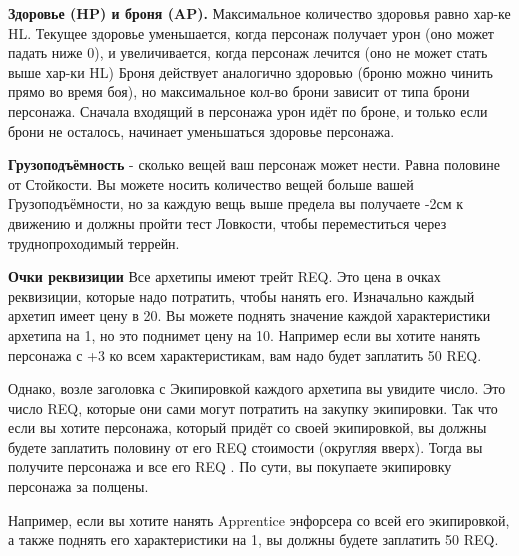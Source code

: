 \begin{multicols}{2}
\textbf{Здоровье (HP) и броня (AP).}
Максимальное количество здоровья равно хар-ке HL. Текущее здоровье уменьшается, когда персонаж получает 
урон (оно может падать ниже 0), и увеличивается, когда персонаж лечится (оно не может стать выше хар-ки HL) 
Броня действует аналогично здоровью (броню можно чинить прямо во время боя), но максимальное кол-во брони 
зависит от типа брони персонажа. Сначала входящий в персонажа урон идёт по броне, и только если брони не осталось, 
начинает уменьшаться здоровье персонажа.

\textbf{Грузоподъёмность}
- сколько вещей ваш персонаж может нести. Равна половине от Стойкости.
Вы можете носить количество вещей больше вашей Грузоподъёмности, но за каждую вещь выше предела вы получаете -2см 
к движению и должны пройти тест Ловкости, чтобы переместиться через труднопроходимый террейн.

\textbf{Очки реквизиции}
Все архетипы имеют трейт REQ. Это цена в очках реквизиции, которые надо потратить, чтобы нанять его.
 Изначально каждый архетип имеет цену в 20. Вы можете поднять значение каждой характеристики архетипа 
 на 1, но это поднимет цену на 10. Например если вы хотите нанять персонажа с +3 ко всем характеристикам,
  вам надо будет заплатить 50 REQ.

Однако, возле заголовка с Экипировкой каждого архетипа вы увидите число. Это число REQ, которые они 
сами могут потратить на закупку экипировки. Так что если вы хотите персонажа, который придёт со своей
 экипировкой, вы должны будете заплатить половину от его REQ стоимости (округляя вверх). Тогда вы 
 получите персонажа и все его REQ . По сути, вы покупаете экипировку персонажа за полцены.

Например, если вы хотите нанять Apprentice энфорсера со всей его экипировкой, а также поднять его 
характеристики на 1, вы должны будете заплатить 50 REQ.

\end{multicols}